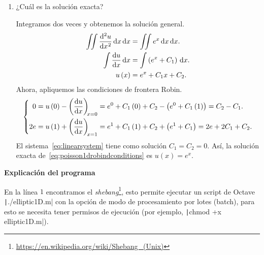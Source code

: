 \begin{problem}
\begin{enumerate}
    \item

          ¿Cuál es la solución exacta?

          \begin{solution}
              Integramos dos veces y obtenemos la solución general.
              \begin{align*}
                  \iint
                  \diff[2]{u}{x}
                  \dl x
                  \dl x           & =
                  \iint
                  e^{x}
                  \dl x
                  \dl x.              \\
                  \int
                  \diff{u}{x}
                  \dl x           & =
                  \int
                  \left(e^{x}+C_{1}\right)
                  \dl x.              \\
                  u\left(x\right) & =
                  e^{x}+C_{1}x+C_{2}.
              \end{align*}
              Ahora, apliquemos las condiciones de frontera Robin.
              \begin{equation}\label{eq:linearsystem}
                  \left\{
                  \begin{aligned}
                      0
                       & =
                      u\left(0\right)-
                      \diff{u}{x}[x=0]=
                      e^{0}+C_{1}\left(0\right)+C_{2}-
                      \left(e^{0}+C_{1}\left(1\right)\right)=
                      C_{2}-C_{1}. \\
                      2e
                       & =
                      u\left(1\right)+
                      \diff{u}{x}[x=1]=
                      e^{1}+C_{1}\left(1\right)+C_{2}+
                      \left(e^{1}+C_{1}\right)=
                      2e+2C_{1}+C_{2}.
                  \end{aligned}
                  \right.
              \end{equation}
              El sistema~\eqref{eq:linearsystem} tiene como solución
              $C_{1}=C_{2}=0$.
              Así, la solución exacta
              de~\eqref{eq:poisson1drobindconditions} es
              $u\left(x\right)=e^{x}$.
          \end{solution}
\end{enumerate}

\textsf{\bfseries Explicación del programa}

En la línea $1$ encontramos el
\emph{shebang}\footnote{\url{https://en.wikipedia.org/wiki/Shebang_(Unix)}},
esto permite ejecutar un script de Octave \texttt|./elliptic1D.m|
con la opción de modo de procesamiento por lotes (batch), para esto
se necesita tener permisos de ejecución (por ejemplo,
\texttt|chmod +x elliptic1D.m|).


\end{problem}
